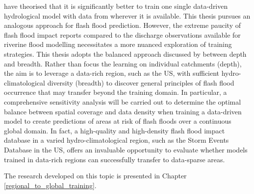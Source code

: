 \citet{Kratzert_2024}  have theorised that it is significantly better to train one single data-driven hydrological model with data from wherever it is available. This thesis pursues an analogous approach for flash flood prediction. However, the extreme paucity of flash flood impact reports compared to the discharge observations available for riverine flood modelling necessitates a more nuanced exploration of training strategies. This thesis adopts the balanced approach discussed by \citet{Gupta_2014} between depth and breadth. Rather than focus the learning on individual catchments (depth), the aim is to leverage a data-rich region, such as the US, with sufficient hydro-climatological diversity (breadth) to discover general principles of flash flood occurrence that may transfer beyond the training domain. In particular, a comprehensive sensitivity analysis will be carried out to determine the optimal balance between spatial coverage and data density when training a data-driven model to create predictions of areas at risk of flash floods over a continuous global domain. In fact, a high-quality and high-density flash flood impact database in a varied hydro-climatological region, such as the Storm Events Database in the US, offers an invaluable opportunity to evaluate whether models trained in data-rich regions can successfully transfer to data-sparse areas.

The research developed on this topic is presented in Chapter  \ref{regional_to_global_training}. 